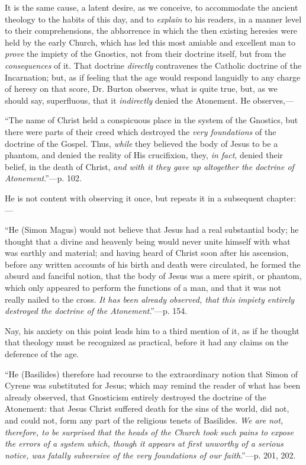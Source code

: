 It is the
same cause, a latent desire, as we conceive, to accommodate the ancient
theology to the habits of this day, and to \emph{explain} to his
readers, in a manner level to their comprehensions, the abhorrence in
which the then existing heresies were held by the early Church, which
has led this most amiable and excellent man to \emph{prove} the impiety
of the Gnostics, not from their doctrine itself, but from the \emph{consequences}
of it. That doctrine \emph{directly} contravenes the Catholic doctrine
of the Incarnation; but, as if feeling that the age would respond
languidly to any charge of heresy on that score, Dr. Burton observes,
what is quite true, but, as we should say, superfluous, that it \emph{indirectly}
denied the Atonement. He observes,—

``The name
of Christ held a conspicuous place in the system of the Gnostics, but
there were parts of their creed which destroyed the \emph{very foundations}
of the doctrine of the Gospel. Thus, \emph{while} they believed the body
of Jesus to be a phantom, and denied the reality of His crucifixion,
they, \emph{in fact}, denied their belief, in the death of Christ, \emph{and
with it they gave up altogether the doctrine of Atonement}.''—p.
102.

He is not
content with observing it once, but repeats it in a subsequent
chapter:—

``He
(Simon Magus) would not believe that Jesus had a real substantial body;
he thought that a divine and heavenly being would never unite
himself with what was earthly and material; and having heard of Christ
soon after his ascension, before any written accounts of his birth and
death were circulated, he formed the absurd and fanciful notion, that
the body of Jesus was a mere spirit, or phantom, which only appeared to
perform the functions of a man, and that it was not really nailed to the
cross. \emph{It has been already observed, that this impiety entirely
destroyed the doctrine of the Atonement}.''—p. 154.

Nay, his
anxiety on this point leads him to a third mention of it, as if he
thought that theology must be recognized as practical, before it had any
claims on the deference of the age.

``He (Basilides)
therefore had recourse to the extraordinary notion that Simon of Cyrene
was substituted for Jesus; which may remind the reader of what has been
already observed, that Gnosticism entirely destroyed the doctrine of the
Atonement: that Jesus Christ suffered death for the sins of the world,
did not, and could not, form any part of the religious tenets of
Basilides. \emph{We are not, therefore, to be surprised that the heads of
the Church took such pains to expose the errors of a system which,
though it appears at first unworthy of a serious notice, was fatally
subversive of the very foundations of our faith}.''—p. 201, 202.

